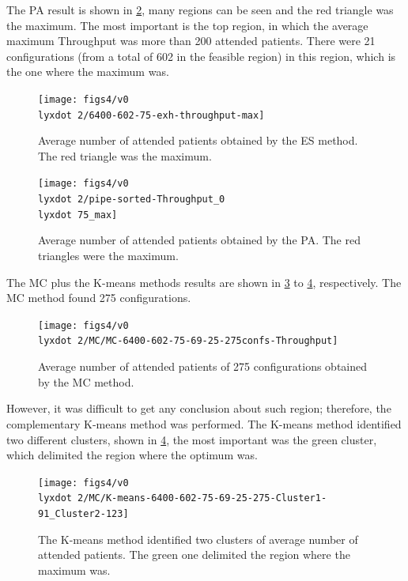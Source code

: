 The PA result is shown in \ref{subfig:pipe12-2}, many regions can
be seen and the red triangle was the maximum. The most important is
the top region, in which the average maximum Throughput was more than
200 attended patients. There were 21 configurations (from a total
of 602 in the feasible region) in this region, which is the one where
the maximum was.

\begin{figure}[H]
\centering{}\texttt{[image: figs4/v0\\lyxdot 2/6400-602-75-exh-throughput-max]}\caption{Average number of attended patients obtained by the ES method. The
red triangle was the maximum. \label{subfig:es12-2}}
\end{figure}
 
\begin{figure}[H]
\centering{}\texttt{[image: figs4/v0\\lyxdot 2/pipe-sorted-Throughput\_0\\lyxdot 75\_max]}\caption{Average number of attended patients obtained by the PA. The red triangles
were the maximum.\label{subfig:pipe12-2}}
\end{figure}


The MC plus the K-means methods results are shown in \ref{subfig:mc12-2}
to \ref{subfig:km12-2}, respectively. The MC method found 275 configurations.
\begin{figure}[H]
\centering{}\texttt{[image: figs4/v0\\lyxdot 2/MC/MC-6400-602-75-69-25-275confs-Throughput]}\caption{Average number of attended patients of 275 configurations obtained
by the MC method. \label{subfig:mc12-2}}
\end{figure}
 However, it was difficult to get any conclusion about such region;
therefore, the complementary K-means method was performed. The K-means
method identified two different clusters, shown in \ref{subfig:km12-2},
the most important was the green cluster, which delimited the region
where the optimum was.
\begin{figure}[H]
\begin{centering}
\texttt{[image: figs4/v0\\lyxdot 2/MC/K-means-6400-602-75-69-25-275-Cluster1-91\_Cluster2-123]}
\par\end{centering}

\caption{The K-means method identified two clusters of average number of attended
patients. The green one delimited the region where the maximum was.\label{subfig:km12-2}}
\end{figure}


